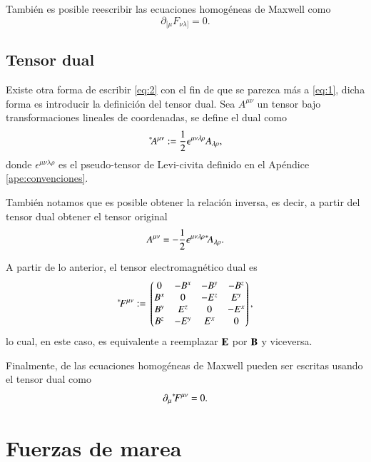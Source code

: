 También es posible reescribir las ecuaciones homogéneas de Maxwell como
\begin{equation}
\label{eq:2}
\partial_{[\mu} F_{\nu \lambda]} = 0.
\end{equation}

\subsection{Tensor dual}

Existe otra forma de escribir \eqref{eq:2} con el fin de que se parezca más a \eqref{eq:1}, dicha forma es introducir la definición del tensor dual. Sea $A^{\mu \nu}$ un tensor bajo transformaciones lineales de coordenadas, se define el dual como
\begin{equation}
{}^*\! A^{\mu \nu} := \frac{1}{2} \epsilon^{\mu \nu \lambda \rho} A_{\lambda \rho},
\end{equation}
donde $\epsilon^{\mu \nu \lambda \rho}$ es el pseudo-tensor de Levi-civita definido en el Apéndice \ref{ape:convenciones}.

También notamos que es posible obtener la relación inversa, es decir, a partir del tensor dual obtener el tensor original
\begin{equation}
A^{\mu \nu} = -\frac{1}{2} \epsilon^{\mu \nu \lambda \rho} {}^*\! A_{\lambda \rho}.
\end{equation}

A partir de lo anterior, el tensor electromagnético dual es
\begin{equation}
\label{eq:3}
\dual{F}^{\mu \nu} := \mqty*(
0 & -B^x & -B^y & -B^z \\
B^x & 0 & -E^z & E^y \\
B^y & E^z & 0 & -E^x \\
B^z & -E^y & E^x & 0 \\ 
),
\end{equation}
lo cual, en este caso, es equivalente a reemplazar $\vb{E}$ por $\vb{B}$ y viceversa.

Finalmente, de las ecuaciones homogéneas de Maxwell pueden ser escritas usando el tensor dual como
\begin{equation}
\partial_{\mu} {}^*\! F^{\mu \nu} = 0.
\end{equation}

\section{Fuerzas de marea}
\label{sec:1}

